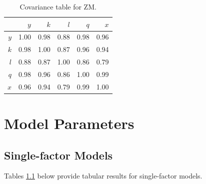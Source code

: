 \documentclass[preprint,authoryear,12pt]{elsarticle}\usepackage{graphicx, color}
\begin{document}
\begin{table}[H]
\begin{center}
\caption{Covariance table for ZM.}
\label{tab:Covariance_ZM}
{\tiny
\begin{tabular}{rrrrrr}
  \hline
 & $y$ & $k$ & $l$ & $q$ & $x$ \\ 
  \hline
$y$ & 1.00 & 0.98 & 0.88 & 0.98 & 0.96 \\ 
  $k$ & 0.98 & 1.00 & 0.87 & 0.96 & 0.94 \\ 
  $l$ & 0.88 & 0.87 & 1.00 & 0.86 & 0.79 \\ 
  $q$ & 0.98 & 0.96 & 0.86 & 1.00 & 0.99 \\ 
  $x$ & 0.96 & 0.94 & 0.79 & 0.99 & 1.00 \\ 
   \hline
\end{tabular}
}
\end{center}
\end{table}



\section{Model Parameters}
\setcounter{table}{0} %

\subsection{Single-factor Models}

Tables \ref{} below provide tabular results for single-factor models.
\end{document}
